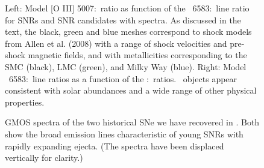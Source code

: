 \begin{figure}
\caption{Left: Model [O III] 5007:\hb\ ratio as function of the \nii\ 6583:\ha\ line ratio for SNRs and SNR candidates with spectra. As discussed in the text, the black, green and blue meshes correspond to shock models from Allen et al. (2008) with a range of shock velocities and pre-shock magnetic fields, and with metallicities corresponding to the SMC (black), LMC (green), and Milky Way (blue).  Right: Model \nii\ 6583:\ha\ line ratios as a function of the \sii:\ha\ ratios.  \gal\ objects appear consistent with solar abundances and a wide range of other physical properties.  \label{fig_model}}
\end{figure}

\begin{figure}
\caption{GMOS spectra of the two historical SNe we have recovered in \gal.  Both show the broad emission lines characteristic of young SNRs with rapidly expanding ejecta.  (The spectra have been displaced vertically for clarity.) \label{historical_SNe}}
\end{figure}


\vspace{5mm}





